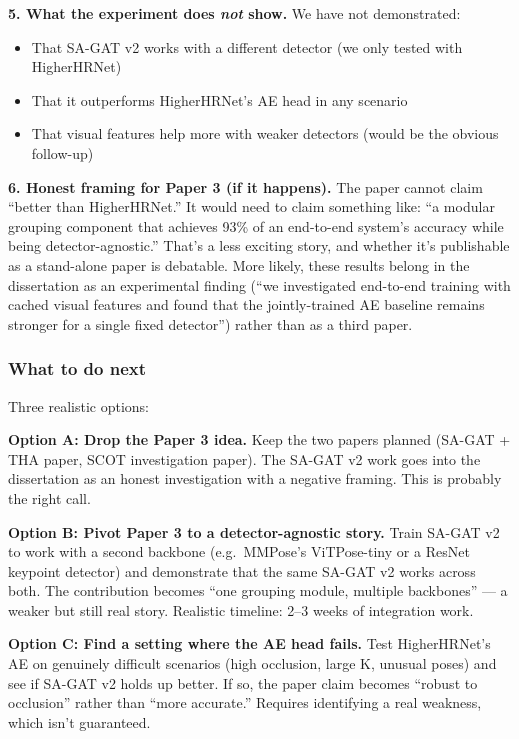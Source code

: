 \textbf{5. What the experiment does \emph{not} show.} We have not demonstrated:
\begin{itemize}
    \item That SA-GAT v2 works with a different detector (we only tested with HigherHRNet)
    \item That it outperforms HigherHRNet's AE head in any scenario
    \item That visual features help more with weaker detectors (would be the obvious follow-up)
\end{itemize}

\textbf{6. Honest framing for Paper 3 (if it happens).} The paper cannot claim ``better than HigherHRNet.'' It would need to claim something like: ``a modular grouping component that achieves 93\% of an end-to-end system's accuracy while being detector-agnostic.'' That's a less exciting story, and whether it's publishable as a stand-alone paper is debatable. More likely, these results belong in the dissertation as an experimental finding (``we investigated end-to-end training with cached visual features and found that the jointly-trained AE baseline remains stronger for a single fixed detector'') rather than as a third paper.

\subsubsection{What to do next}

Three realistic options:

\textbf{Option A: Drop the Paper 3 idea.} Keep the two papers planned (SA-GAT + THA paper, SCOT investigation paper). The SA-GAT v2 work goes into the dissertation as an honest investigation with a negative framing. This is probably the right call.

\textbf{Option B: Pivot Paper 3 to a detector-agnostic story.} Train SA-GAT v2 to work with a second backbone (e.g.\ MMPose's ViTPose-tiny or a ResNet keypoint detector) and demonstrate that the same SA-GAT v2 works across both. The contribution becomes ``one grouping module, multiple backbones'' --- a weaker but still real story. Realistic timeline: 2--3 weeks of integration work.

\textbf{Option C: Find a setting where the AE head fails.} Test HigherHRNet's AE on genuinely difficult scenarios (high occlusion, large K, unusual poses) and see if SA-GAT v2 holds up better. If so, the paper claim becomes ``robust to occlusion'' rather than ``more accurate.'' Requires identifying a real weakness, which isn't guaranteed.

